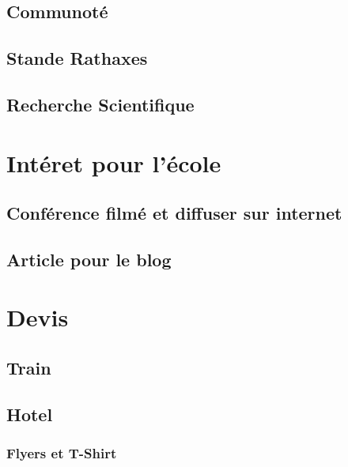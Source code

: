 \documentclass{rtxreport}
\begin{document}
\section{Communoté}

\section{Stande Rathaxes}


\section{Recherche Scientifique}

\chapter{Intéret pour l'école}
\section{Conférence filmé et diffuser sur internet}
\section{Article pour le blog}


\chapter{Devis}
\section{Train}
\section{Hotel}


\subsection{Flyers et T-Shirt}







\rtxbibliography
\end{document}
